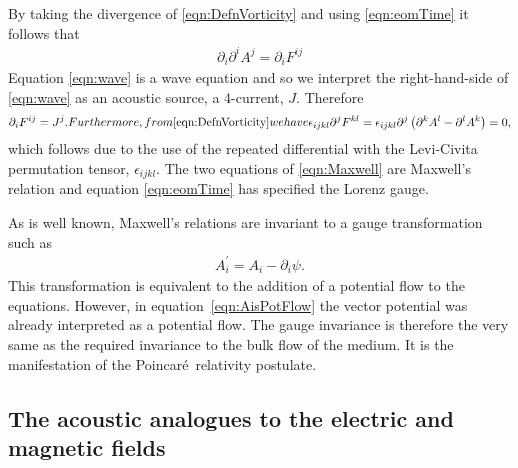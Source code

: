 \documentclass[10pt, fleqn,final,showtrims,oldfontcommands, article,a4paper,oneside]{memoir} %
\newcommand{\sub}[1]{\begin{subequations}#1\end{subequations}}
\newcommand{\eqa}[1]{\begin{align}#1\end{align}}
\newcommand{\eqal}[2]{\begin{align}#1\label{eqn:#2}\end{align}}
\newcommand{\eqnref}[1]{\ref{eqn:#1}}
\newcommand{\lr}[1]{\left( #1 \right)}
\renewcommand{\d}{\partial}
\newcommand{\del}{\nabla}
\newcommand{\Poincare}{Poincar{\'e}}
\begin{document}
By taking the divergence of \eqnref{DefnVorticity} and using \eqnref{eomTime} it follows that 
\eqal{
  \d_i \d^i A^j = \d_i F^{i j}
}{wave}
Equation \eqnref{wave} is a wave equation and so we interpret the right-hand-side of \eqnref{wave} as an acoustic source,
a 4-current, $J$.
Therefore 
\sub{
\label{eqn:Maxwell}
\eqa{
  \d_i F^{i j} = J^j.
}
Furthermore, from \eqnref{DefnVorticity} we have
\begin{align}
  \epsilon_{i j k l} \d^j F^{k l} = \epsilon_{i j k l} \d^j \lr{\d^k A^l - \d^l A^k} = 0,
\end{align}
}
which follows due to the use of the repeated differential with the Levi-Civita permutation tensor, $\epsilon_{i j k l}$.
The two equations of \eqnref{Maxwell} are Maxwell's relation and equation \eqnref{eomTime} has specified the Lorenz gauge.

As is well known, Maxwell's relations are invariant to a gauge transformation such as
\begin{align}
  A_i^\prime = A_i - \d_i \psi.
\end{align}
This transformation is equivalent to the addition of a potential flow to the equations.
However, in equation~\eqnref{AisPotFlow} the vector potential was already interpreted as a potential flow.
The gauge invariance is therefore the very same as the required invariance to the bulk flow of the medium.
It is the manifestation of the \Poincare\ relativity postulate.






\subsection{The acoustic analogues to the electric and magnetic fields}\label{sec:int:EM}
\end{document}
